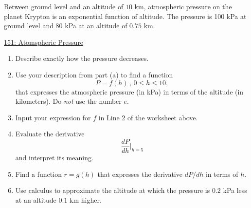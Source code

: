 \documentclass{ximera}
\begin{document}
\begin{question}  \label{Qgfhhfhdffv}
Between ground level and an altitude of $10$ km, atmospheric pressure on the planet Krypton is an exponential function of altitude. The pressure is 100 kPa at ground level and 80 kPa at an altitude of $0.75$ km.

\begin{onlineOnly}
    \begin{center}
\end{center}
\end{onlineOnly}

\href{https://www.desmos.com/calculator/j5h8kaj8xs}{151: Atomspheric Pressure}

\begin{enumerate}
\item Describe exactly how the pressure decreases.

\item Use your description from part (a) to find a function
\[
         P = f(h) \, , \, 0\leq h \leq 10 ,
\]
that expresses the atmospheric pressure (in kPa) in terms of the altitude (in kilometers). Do \emph{not} use the number $e$.

\item Input your expression for $f$ in Line 2 of the worksheet above.

\item Evaluate the derivative 
\[
       \frac{dP}{dh}\Big|_{h=5}
\]
and interpret its meaning.

\item Find a function $r=g(h)$ that expresses the derivative $dP/dh$ in terms of $h$.

\item Use calculus to approximate the altitude at which the pressure is $0.2$ kPa less at an altitude $0.1$ km higher.

\end{enumerate}
  
\end{question}
\end{document}
